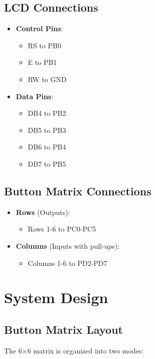 \documentclass{article}
\begin{document}
\subsection{LCD Connections}
\begin{itemize}
    \item \textbf{Control Pins}:
    \begin{itemize}
        \item RS to PB0
        \item E to PB1
        \item RW to GND
    \end{itemize}
    \item \textbf{Data Pins}:
    \begin{itemize}
        \item DB4 to PB2
        \item DB5 to PB3
        \item DB6 to PB4
        \item DB7 to PB5
    \end{itemize}
\end{itemize}

\subsection{Button Matrix Connections}
\begin{itemize}
    \item \textbf{Rows} (Outputs):
    \begin{itemize}
        \item Rows 1-6 to PC0-PC5
    \end{itemize}
    \item \textbf{Columns} (Inputs with pull-ups):
    \begin{itemize}
        \item Columns 1-6 to PD2-PD7
    \end{itemize}
\end{itemize}

\section{System Design}

\subsection{Button Matrix Layout}
The 6×6 matrix is organized into two modes:
\end{document}
